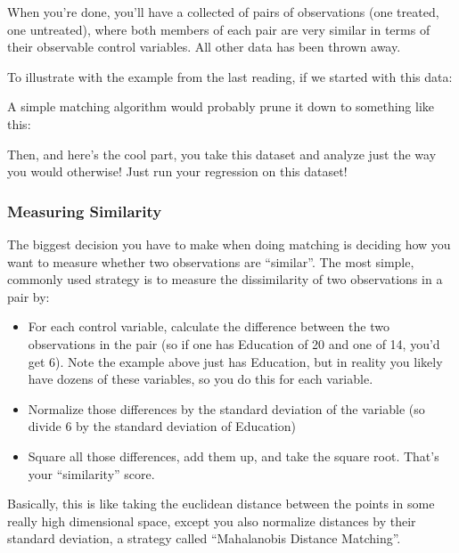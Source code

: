 \documentclass[letterpaper,10pt,english]{jupyterBook}
\begin{document}
\sphinxAtStartPar
When you’re done, you’ll have a collected of pairs of observations (one treated, one untreated), where both members of each pair are very similar in terms of their observable control variables. All other data has been thrown away.

\sphinxAtStartPar
To illustrate with the example from the last reading, if we started with this data:

\sphinxAtStartPar
A simple matching algorithm would probably prune it down to something like this:

\sphinxAtStartPar
{}

\sphinxAtStartPar
Then, and here’s the cool part, you take this dataset and analyze just the way you would otherwise! Just run your regression on this dataset!


\subsubsection{Measuring Similarity}
\label{\detokenize{35_causal/90_matching_how:measuring-similarity}}
\sphinxAtStartPar
The biggest decision you have to make when doing matching is deciding how you want to measure whether two observations are “similar”. The most simple, commonly used strategy is to measure the dissimilarity of two observations in a pair by:
\begin{itemize}
\item {} 
\sphinxAtStartPar
For each control variable, calculate the difference between the two observations in the pair (so if one has Education of 20 and one of 14, you’d get 6). Note the example above just has Education, but in reality you likely have dozens of these variables, so you do this for each variable.

\item {} 
\sphinxAtStartPar
Normalize those differences by the standard deviation of the variable (so divide 6 by the standard deviation of Education)

\item {} 
\sphinxAtStartPar
Square all those differences, add them up, and take the square root. That’s your “similarity” score.

\end{itemize}

\sphinxAtStartPar
Basically, this is like taking the euclidean distance between the points in some really high dimensional space, except you also normalize distances by their standard deviation, a strategy called “Mahalanobis Distance Matching”.
\end{document}
